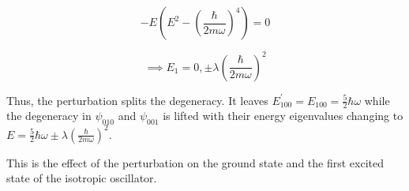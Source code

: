     \begin{equation*}
        -E\left( E^2 - \left( \frac{\hbar}{2m\omega} \right)^4 \right) = 0 
    \end{equation*}

    \begin{equation*}
        \implies E_1 = 0, \pm\lambda\left( \frac{\hbar}{2m\omega} \right)^2
    \end{equation*}

    Thus, the perturbation splits the degeneracy. It leaves $E^{'}_{100} = E_{100} = \frac{5}{2}\hbar\omega$ while the degeneracy in $\psi_{010}$ and $\psi_{001}$ is lifted with their energy eigenvalues changing to $E = \frac{5}{2}\hbar\omega \pm\lambda\left( \frac{\hbar}{2m\omega} \right)^2$.

    This is the effect of the perturbation on the ground state and the first excited state of the isotropic oscillator.
